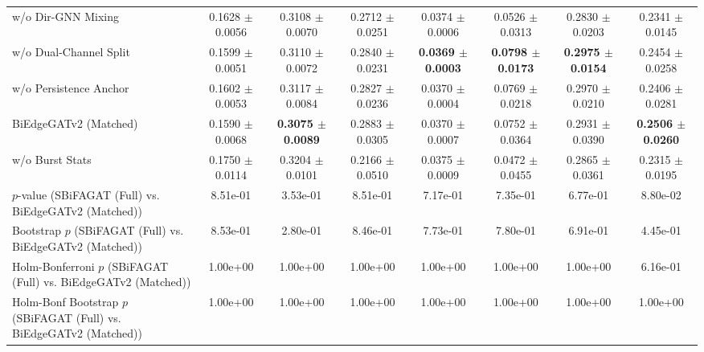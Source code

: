 \begin{table}[t]
{\begin{tabular}{lccccccc}
w/o Dir-GNN Mixing & 0.1628 $\pm$ 0.0056 & 0.3108 $\pm$ 0.0070 & 0.2712 $\pm$ 0.0251 & 0.0374 $\pm$ 0.0006 & 0.0526 $\pm$ 0.0313 & 0.2830 $\pm$ 0.0203 & 0.2341 $\pm$ 0.0145 \\
w/o Dual-Channel Split & 0.1599 $\pm$ 0.0051 & 0.3110 $\pm$ 0.0072 & 0.2840 $\pm$ 0.0231 & \textbf{0.0369 $\pm$ 0.0003} & \textbf{0.0798 $\pm$ 0.0173} & \textbf{0.2975 $\pm$ 0.0154} & 0.2454 $\pm$ 0.0258 \\
w/o Persistence Anchor & 0.1602 $\pm$ 0.0053 & 0.3117 $\pm$ 0.0084 & 0.2827 $\pm$ 0.0236 & 0.0370 $\pm$ 0.0004 & 0.0769 $\pm$ 0.0218 & 0.2970 $\pm$ 0.0210 & 0.2406 $\pm$ 0.0281 \\
BiEdgeGATv2 (Matched) & 0.1590 $\pm$ 0.0068 & \textbf{0.3075 $\pm$ 0.0089} & 0.2883 $\pm$ 0.0305 & 0.0370 $\pm$ 0.0007 & 0.0752 $\pm$ 0.0364 & 0.2931 $\pm$ 0.0390 & \textbf{0.2506 $\pm$ 0.0260} \\
w/o Burst Stats & 0.1750 $\pm$ 0.0114 & 0.3204 $\pm$ 0.0101 & 0.2166 $\pm$ 0.0510 & 0.0375 $\pm$ 0.0009 & 0.0472 $\pm$ 0.0455 & 0.2865 $\pm$ 0.0361 & 0.2315 $\pm$ 0.0195 \\
\midrule
$p$-value (SBiFAGAT (Full) vs. BiEdgeGATv2 (Matched)) & 8.51e-01 & 3.53e-01 & 8.51e-01 & 7.17e-01 & 7.35e-01 & 6.77e-01 & 8.80e-02 \\
Bootstrap $p$ (SBiFAGAT (Full) vs. BiEdgeGATv2 (Matched)) & 8.53e-01 & 2.80e-01 & 8.46e-01 & 7.73e-01 & 7.80e-01 & 6.91e-01 & 4.45e-01 \\
Holm-Bonferroni $p$ (SBiFAGAT (Full) vs. BiEdgeGATv2 (Matched)) & 1.00e+00 & 1.00e+00 & 1.00e+00 & 1.00e+00 & 1.00e+00 & 1.00e+00 & 6.16e-01 \\
Holm-Bonf Bootstrap $p$ (SBiFAGAT (Full) vs. BiEdgeGATv2 (Matched)) & 1.00e+00 & 1.00e+00 & 1.00e+00 & 1.00e+00 & 1.00e+00 & 1.00e+00 & 1.00e+00 \\
\bottomrule
\end{tabular}
}
\end{table}
